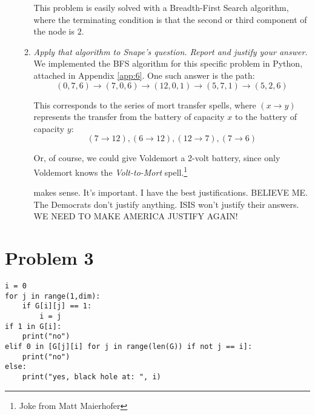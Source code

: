 \documentclass[12pt]{article}
\begin{document}
\begin{enumerate}
\begin{enumerate}
	This problem is easily solved with a Breadth-First Search algorithm, where the terminating condition is that the second or third component of the node 
is $2$.\\
	
	\newpage
	\item \textit{Apply that algorithm to Snape's question. Report and justify your answer.} \\
	
	We implemented the BFS algorithm for this specific problem in Python, attached in Appendix \ref{app:6}. One such answer is the path:
	\[
	(0,7,6)\rightarrow(7,0,6)\rightarrow(12,0,1)\rightarrow(5,7,1)\rightarrow(5,2,6)
	\]
	
	This corresponds to the series of mort transfer spells, where $(x\rightarrow y)$ represents the transfer from the battery of capacity $x$ to the 
battery of capacity $y$:
	\[
	    (7\rightarrow12), (6\rightarrow12), (12\rightarrow7), (7\rightarrow6)
	\]

    Or, of course, we could give Voldemort a 2-volt battery, since only Voldemort knows the \textit{Volt-to-Mort} spell.\footnote{Joke from Matt Maierhofer}
	
	
	
makes sense. It's important. I have the best justifications. BELIEVE ME. The Democrats don't justify anything. ISIS won't justify their answers. WE NEED TO 
MAKE AMERICA JUSTIFY AGAIN!
	\end{enumerate}
	

\end{enumerate}

\newpage
\appendix
\section{Problem 3}
\label{app:3}
\begin{small}
\begin{verbatim}
i = 0
for j in range(1,dim):
    if G[i][j] == 1:
        i = j
if 1 in G[i]:
    print("no")
elif 0 in [G[j][i] for j in range(len(G)) if not j == i]:
    print("no")
else:
    print("yes, black hole at: ", i)
\end{verbatim}
\end{small}
\end{document}

